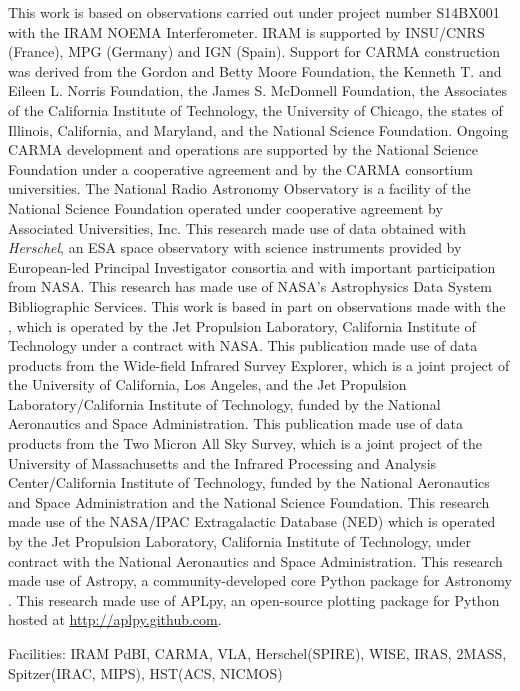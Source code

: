\documentclass[]{emulateapj}
\begin{document}
\acknowledgments
This work is based on observations carried out under project number S14BX001
with the IRAM NOEMA Interferometer. IRAM is supported by INSU/CNRS (France), MPG (Germany) and IGN (Spain).
Support for CARMA construction was derived from the Gordon and Betty Moore
Foundation, the Kenneth T. and Eileen L. Norris Foundation, the James S.
McDonnell Foundation, the Associates of the California Institute of
Technology, the University of Chicago, the states of Illinois, California, and
Maryland, and the National Science Foundation. Ongoing CARMA development and
operations are supported by the National Science Foundation under a
cooperative agreement and by the CARMA consortium universities.
The National Radio Astronomy Observatory is a facility of the National Science
Foundation operated under cooperative agreement by Associated
Universities, Inc.
This research made use of data obtained with {\it Herschel}, an ESA space
observatory with science instruments provided by European-led Principal
Investigator consortia and with important participation from NASA.
This research has made use of NASA's Astrophysics Data System Bibliographic
Services.
This work is based in part on observations made with the \spitzer,
which is operated by the Jet Propulsion Laboratory, California Institute of
Technology under a contract with NASA.
This publication made use of data products from the Wide-field Infrared
Survey Explorer, which is a joint project of the University of California, Los
Angeles, and the Jet Propulsion Laboratory/California Institute of Technology,
funded by the National Aeronautics and Space Administration.
This publication made use of data products from the Two Micron All Sky
Survey, which is a joint project of the University of Massachusetts and the
Infrared Processing and Analysis Center/California Institute of Technology,
funded by the National Aeronautics and Space Administration and the National
Science Foundation.
This research made use of the NASA/IPAC Extragalactic Database (NED) which
is operated by the Jet Propulsion Laboratory, California Institute of
Technology, under contract with the National Aeronautics and Space
Administration.
This research made use of Astropy, a community-developed core Python package for Astronomy \citep{astropy}.
This research made use of APLpy, an open-source plotting package for Python hosted at \url{http://aplpy.github.com}.

Facilities: IRAM PdBI, CARMA, VLA, Herschel(SPIRE), WISE, IRAS, 2MASS, Spitzer(IRAC, MIPS), HST(ACS, NICMOS)




\end{document}
